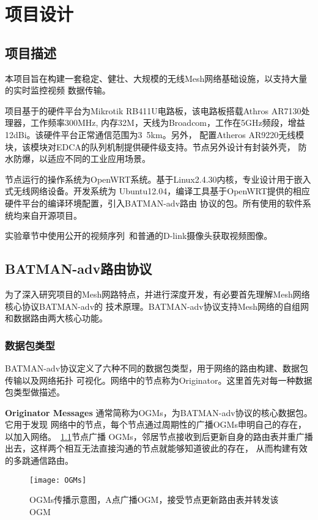 \chapter{项目设计}
\label{cha:project_design}

\section{项目描述}
本项目旨在构建一套稳定、健壮、大规模的无线Mesh网络基础设施，以支持大量的实时监控视频
数据传输。

项目基于的硬件平台为Mikrotik RB411U电路板，该电路板搭载Athros AR7130处理器，工作频率300MHz,
内存32M，天线为Broadcom，工作在5GHz频段，增益12dBi。该硬件平台正常通信范围为3~5km。另外，
配置Atheros AR9220无线模块，该模块对EDCA的队列机制提供硬件级支持。节点另外设计有封装外壳，
防水防爆，以适应不同的工业应用场景。

节点运行的操作系统为OpenWRT系统。基于Linux2.4.30内核，专业设计用于嵌入式无线网络设备。开发系统为
Ubuntu12.04，编译工具基于OpenWRT提供的相应硬件平台的编译环境配置，引入BATMAN-adv路由
协议的包。所有使用的软件系统均来自开源项目。

实验章节中使用公开的视频序列~\cite{videos}和普通的D-link摄像头获取视频图像。

\section{BATMAN-adv路由协议}
为了深入研究项目的Mesh网路特点，并进行深度开发，有必要首先理解Mesh网络核心协议BATMAN-adv的
技术原理。BATMAN-adv协议支持Mesh网络的自组网和数据路由两大核心功能。

\subsection{数据包类型}
BATMAN-adv协议定义了六种不同的数据包类型，用于网络的路由构建、数据包传输以及网络拓扑
可视化。网络中的节点称为Originator。这里首先对每一种数据包类型做描述。

\textbf{Originator Messages} 通常简称为OGMs，为BATMAN-adv协议的核心数据包。它用于发现
网络中的节点，每个节点通过周期性的广播OGMs申明自己的存在，以加入网络。~\ref{fig:ogms}节点广播
OGMs，邻居节点接收到后更新自身的路由表并重广播出去，这样两个相互无法直接沟通的节点就能够知道彼此的存在，
从而构建有效的多跳通信路由。
\begin{figure}[H] %
  \centering
  \texttt{[image: OGMs]}
  \caption{OGMs传播示意图，A点广播OGM，接受节点更新路由表并转发该OGM}
  \label{fig:ogms}
\end{figure}

